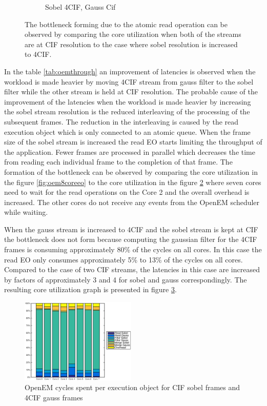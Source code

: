 \begin{figure}
\begin{subfigure}[t]{0.49\textwidth}
        \caption{Sobel 4CIF, Gauss Cif}
        \label{fig:oem8coreeosobel4cif}
    \end{subfigure}
    \caption{The bottleneck forming due to the atomic read operation can be observed by comparing the core utilization when both of the streams are at CIF resolution to the case where sobel resolution is increased to 4CIF.}
\end{figure}

In the table \ref{tab:oemthrough} an improvement of latencies is observed when the workload is made heavier by moving 4CIF stream from gauss filter to the sobel filter while the other stream is held at CIF resolution. The probable cause of the improvement of the latencies when the workload is made heavier by increasing the sobel stream resolution is the reduced interleaving of the processing of the subsequent frames. The reduction in the interleaving is caused by the read execution object which is only connected to an atomic queue. When the frame size of the sobel stream is increased the read EO starts limiting the throughput of the application. Fewer frames are processed in parallel which decreases the time from reading each individual frame to the completion of that frame. The formation of the bottleneck can be observed by comparing the core utilization in the figure \ref{fig:oem8coreeo} to the core utilization in the figure \ref{fig:oem8coreeosobel4cif} where seven cores need to wait for the read operations on the Core 2 and the overall overhead is increased. The other cores do not receive any events from the OpenEM scheduler while waiting.

When the gauss stream is increased to 4CIF and the sobel stream is kept at CIF the bottleneck does not form because computing the gaussian filter for the 4CIF frames is consuming approximately 80\% of the cycles on all cores. In this case the read EO only consumes approximately 5\% to 13\% of the cycles on all cores. Compared to the case of two CIF streams, the latencies in this case are increased by factors of approximately 3 and 4 for sobel and gauss correspondingly. The resulting core utilization graph is presented in figure \ref{fig:oem8coreeogauss4cif}.

\begin{figure}[h]
    \begin{center}
        \includegraphics[width=0.49\textwidth]{images/openem_sobelcif_gauss4cif_eo.eps}
        \caption{OpenEM cycles spent per execution object for CIF sobel frames
        and 4CIF gauss frames}
        \label{fig:oem8coreeogauss4cif}
    \end{center}
\end{figure}
